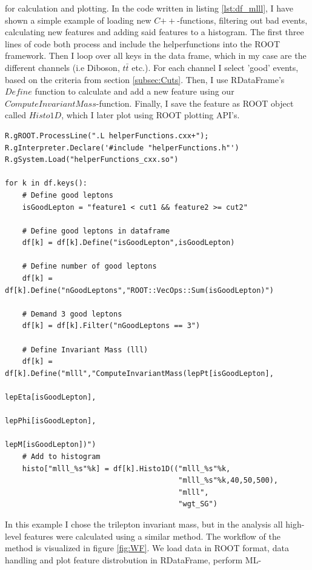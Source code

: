 for calculation and plotting. In the code written in listing \ref{lst:df_mlll}, I have shown a simple example 
of loading new $C{++}$-functions, filtering out bad events, calculating new features and adding said 
features to a histogram. The first three lines of code both process and include the helperfunctions 
into the ROOT framework. Then I loop over all keys in the data frame, which in my case
are the different channels (i.e Diboson, $t\bar{t}$ etc.). For each channel I select 'good' events,
based on the criteria from section \ref{subsec:Cuts}. Then, I use RDataFrame's $Define$ function to calculate
and add a new feature using our $ComputeInvariantMass$-function. Finally, I save the feature as ROOT object called 
$Histo1D$, which I later plot using ROOT plotting \ac{API}'s.
\lstset{style=Python}
\begin{lstlisting}[caption={Python-file for calling dataframe and calculating $M_{lll}$.},captionpos=b, label={lst:df_mlll}]
R.gROOT.ProcessLine(".L helperFunctions.cxx+");
R.gInterpreter.Declare('#include "helperFunctions.h"') 
R.gSystem.Load("helperFunctions_cxx.so")

for k in df.keys():
    # Define good leptons
    isGoodLepton = "feature1 < cut1 && feature2 >= cut2"

    # Define good leptons in dataframe
    df[k] = df[k].Define("isGoodLepton",isGoodLepton)

    # Define number of good leptons
    df[k] = df[k].Define("nGoodLeptons","ROOT::VecOps::Sum(isGoodLepton)")

    # Demand 3 good leptons 
    df[k] = df[k].Filter("nGoodLeptons == 3")

    # Define Invariant Mass (lll)
    df[k] = df[k].Define("mlll","ComputeInvariantMass(lepPt[isGoodLepton], 
                                                      lepEta[isGoodLepton], 
                                                      lepPhi[isGoodLepton], 
                                                      lepM[isGoodLepton])")
    # Add to histogram
    histo["mlll_%s"%k] = df[k].Histo1D(("mlll_%s"%k,
                                        "mlll_%s"%k,40,50,500),
                                        "mlll",
                                        "wgt_SG")     
\end{lstlisting}
In this example I chose the trilepton invariant mass, but in the analysis all high-level features were
calculated using a similar method. The workflow of the method is visualized in figure \ref{fig:WF}. We
load data in ROOT format, data handling and plot feature distrobution  in RDataFrame, perform \ac{ML}-
